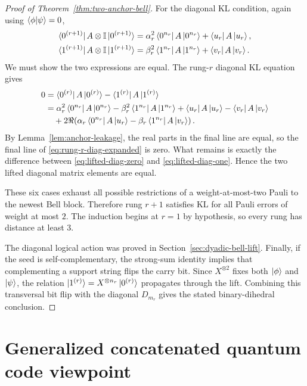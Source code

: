 \documentclass[11pt]{article}
\newcommand{\id}{\mathbb I}
\newcommand{\ketphi}{\ket{\phi}}
\newcommand{\ketpsi}{\ket{\psi}}
\begin{document}
\begin{proof}[Proof of Theorem~\ref{thm:two-anchor-bell}]
For the diagonal KL condition, again using $\braket{\phi|\psi}=0$,
\begin{align}
  \bra{0^{(r+1)}}A\otimes\id\ket{0^{(r+1)}}
  &=\alpha_r^2\bra{0^{n_r}}A\ket{0^{n_r}}
    +\bra{u_r}A\ket{u_r},
    \label{eq:lifted-diag-zero}\\
  \bra{1^{(r+1)}}A\otimes\id\ket{1^{(r+1)}}
  &=\beta_r^2\bra{1^{n_r}}A\ket{1^{n_r}}
    +\bra{v_r}A\ket{v_r}.
    \label{eq:lifted-diag-one}
\end{align}
We must show the two expressions are equal.  The rung-$r$ diagonal KL equation gives
\begin{align}
0
&=\bra{0^{(r)}}A\ket{0^{(r)}}-\bra{1^{(r)}}A\ket{1^{(r)}} \nonumber\\
&=\alpha_r^2\bra{0^{n_r}}A\ket{0^{n_r}}
 -\beta_r^2\bra{1^{n_r}}A\ket{1^{n_r}}
 +\bra{u_r}A\ket{u_r}-\bra{v_r}A\ket{v_r} \nonumber\\
&\quad +2\Re\!\left(\alpha_r\bra{0^{n_r}}A\ket{u_r}
 -\beta_r\bra{1^{n_r}}A\ket{v_r}\right).
 \label{eq:rung-r-diag-expanded}
\end{align}
By Lemma~\ref{lem:anchor-leakage}, the real parts in the final line are equal, so the final line
of \eqref{eq:rung-r-diag-expanded} is zero.  What remains is exactly the difference between
\eqref{eq:lifted-diag-zero} and \eqref{eq:lifted-diag-one}.  Hence the two lifted diagonal matrix
elements are equal.

These six cases exhaust all possible restrictions of a weight-at-most-two Pauli to the newest
Bell block.  Therefore rung $r+1$ satisfies KL for all Pauli errors of weight at most $2$.  The
induction begins at $r=1$ by hypothesis, so every rung has distance at least $3$.

The diagonal logical action was proved in Section~\ref{sec:dyadic-bell-lift}.  Finally, if the
seed is self-complementary, the strong-sum identity implies that complementing a support string
flips the carry bit.  Since $X^{\otimes2}$ fixes both $\ketphi$ and $\ketpsi$, the relation
$\ket{1^{(r)}}=X^{\otimes n_r}\ket{0^{(r)}}$ propagates through the lift.  Combining this
transversal bit flip with the diagonal $D_{m_r}$ gives the stated binary-dihedral conclusion.
\end{proof}

\section{Generalized concatenated quantum code viewpoint}
\label{sec:gcqc}
\end{document}
